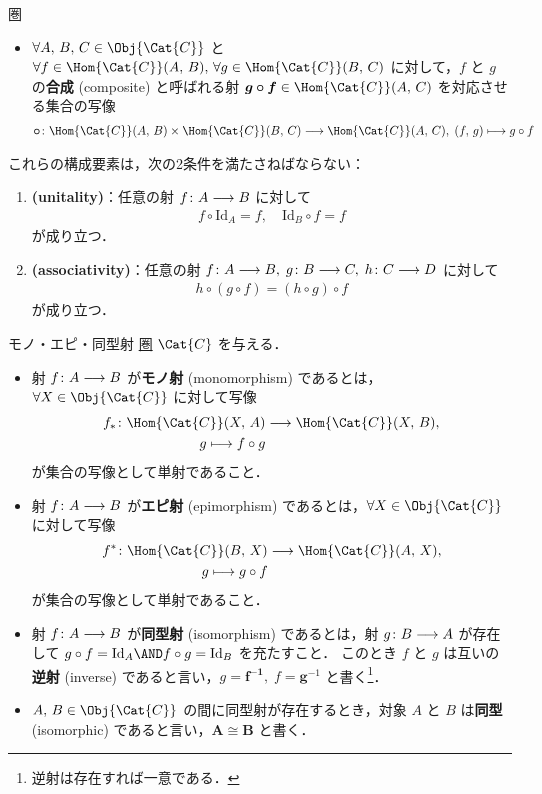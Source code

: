 \documentclass[TQFT_main]{subfiles}
\begin{document}
\begin{mydef}[label=def:category, breakable]{圏}
\begin{itemize}
		\item $\forall A,\, B,\, C \in \Obj{\Cat{C}}$ と $\forall f \in \Hom{\Cat{C}}(A,\, B),\, \forall g \in \Hom{\Cat{C}}(B,\, C)$ に対して，$f$ と $g$ の\textbf{合成} (composite) と呼ばれる射 $\bm{g \circ f} \in \Hom{\Cat{C}}(A,\, C)$ を対応させる集合の写像
		\begin{align}
			\bm{\circ} \colon \Hom{\Cat{C}}(A,\, B) \times \Hom{\Cat{C}}(B,\, C) \lto \Hom{\Cat{C}}(A,\, C),\; (f,\, g) \lmto g\circ f
		\end{align}
	\end{itemize}
	これらの構成要素は，次の2条件を満たさねばならない：
	\begin{enumerate}
		\item \textbf{(unitality)}：任意の射 $f \colon A \longrightarrow B$ に対して
		\begin{align}
			f \circ \mathrm{Id}_A = f,\quad \mathrm{Id}_B \circ f = f
		\end{align}
		が成り立つ．
		\item \textbf{(associativity)}：任意の射 $f \colon A \longrightarrow B,\; g \colon B \longrightarrow C,\; h \colon C \longrightarrow D$ に対して
		\begin{align}
			h \circ (g \circ f) = (h \circ g) \circ f
		\end{align}
		が成り立つ．
	\end{enumerate}
\end{mydef}

\begin{mydef}[label=def:iso]{モノ・エピ・同型射}
	\hyperref[def:category]{圏} $\Cat{C}$ を与える．
	\begin{itemize}
        \item 射 $f \colon A \longrightarrow B$ が\textbf{モノ射} (monomorphism) であるとは，$\forall X \in \Obj{\Cat{C}}$ に対して写像
        \begin{align}
            f_* \colon \Hom{\Cat{C}} (X,\, A) &\lto \Hom{\Cat{C}} (X,\, B), \\
            g \lmto f \circ g
        \end{align}
        が集合の写像として単射であること．
        \item 射 $f \colon A \longrightarrow B$ が\textbf{エピ射} (epimorphism) であるとは，$\forall  X \in \Obj{\Cat{C}}$ に対して写像
        \begin{align}
            f^* \colon \Hom{\Cat{C}} (B,\, X) &\lto \Hom{\Cat{C}} (A,\, X), \\
            g \lmto g \circ f
        \end{align}
        が集合の写像として単射であること．
		\item 射 $f \colon A \longrightarrow B$ が\textbf{同型射} (isomorphism) であるとは，射 $g \colon B \longrightarrow A$ が存在して
		$ g \circ f = \mathrm{Id}_A \AND f \circ g = \mathrm{Id}_B$ を充たすこと．
		このとき $f$ と $g$ は互いの\textbf{逆射} (inverse) であると言い，$g = \bm{f^{-1}},\; f = \bm{g}^{-1}$ と書く\footnote{逆射は存在すれば一意である．}．
		\item $A,\, B \in \Obj{\Cat{C}}$ の間に同型射が存在するとき，対象 $A$ と $B$ は\textbf{同型} (isomorphic) であると言い，$\bm{A\cong B}$ と書く．
	\end{itemize}
\end{mydef}
\end{document}
